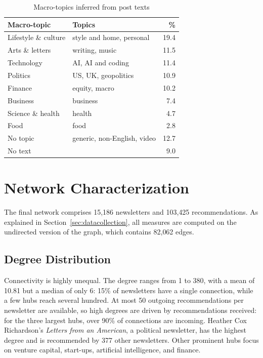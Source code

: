 \documentclass[sigchi]{acmart}
\begin{document}
\begin{table}[h]
  \centering
  \small
  \caption{Macro-topics inferred from post texts}
  \label{tab:topics}
    \begin{tabular}{@{}llr@{}}
    \toprule
    \textbf{Macro-topic} & \textbf{Topics} & \textbf{\%} \\
    \midrule
    Lifestyle \& culture & style and home, personal & 19.4 \\
    Arts \& letters      & writing, music           & 11.5 \\
    Technology           & AI, AI and coding        & 11.4 \\
    Politics             & US, UK, geopolitics      & 10.9 \\
    Finance              & equity, macro            & 10.2 \\
    Business             & business                 & 7.4 \\
    Science \& health    & health                   & 4.7 \\
    Food                 & food                     & 2.8 \\
    \midrule
    No topic             & generic, non-English, video & 12.7 \\
    No text              &                          & 9.0 \\
    \bottomrule
  \end{tabular}
\end{table}

\section{Network Characterization}
\label{sec:network}

The final network comprises 15{,}186 newsletters and 103{,}425
recommendations. As explained in Section~\ref{sec:datacollection}, all
measures are computed on the undirected version of the graph, which
contains 82{,}062 edges.


\subsection{Degree Distribution}
\label{sec:degree}

Connectivity is highly unequal. The degree ranges from 1 to 380, with a mean of 10.81 but a median of only 6: 15\%
of newsletters have a single connection, while a few hubs reach several
hundred. At most 50 outgoing recommendations per newsletter are available, so
high degrees are driven by recommendations received: for the three largest hubs, over 90\% of connections are incoming. Heather Cox Richardson's \emph{Letters from an American}, a political newsletter, has the highest degree and is recommended by 377 other newsletters. Other prominent hubs focus on venture capital, start-ups, artificial intelligence, and finance.
\end{document}
